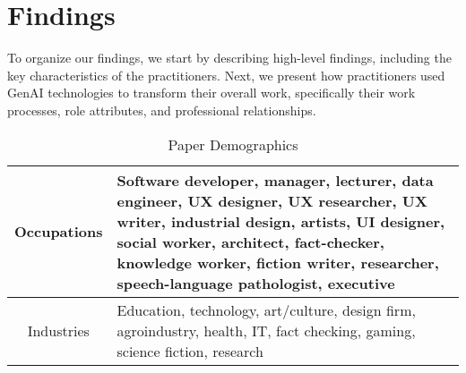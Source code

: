 
\section{Findings}

To organize our findings, we start by describing high-level findings, including the key characteristics of the practitioners. Next, we present how practitioners used GenAI technologies to transform their overall work, specifically their work processes, role attributes, and professional relationships. 




\begin{table}
    \centering
    \begin{tabular}{|c|p{}|}
        \hline
        Occupations & Software developer, manager, lecturer, data engineer, UX designer, UX researcher, UX writer, industrial design,  artists,  UI designer, social worker,  architect, fact-checker, knowledge worker, fiction writer, researcher, speech-language pathologist, executive \\
        \hline
        Industries & Education, technology, art/culture, design firm, agroindustry, health,  IT, fact checking, gaming, science fiction, research \\ 
        \hline 
        
    \end{tabular}
    \caption{Paper Demographics}
    \label{tab:paper_demographics}
\end{table}



